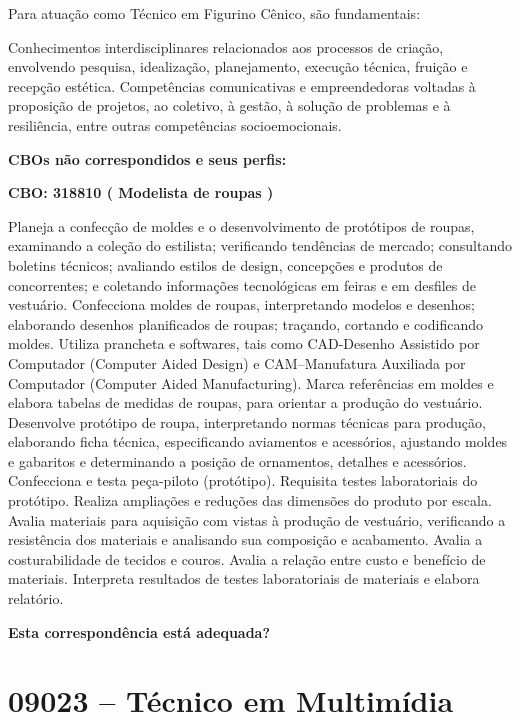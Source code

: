 \documentclass[
]{article}
\begin{document}
Para atuação como Técnico em Figurino Cênico, são fundamentais:

Conhecimentos interdisciplinares relacionados aos processos de criação,
envolvendo pesquisa, idealização, planejamento, execução técnica,
fruição e recepção estética. Competências comunicativas e empreendedoras
voltadas à proposição de projetos, ao coletivo, à gestão, à solução de
problemas e à resiliência, entre outras competências socioemocionais.

\textbf{CBOs não correspondidos e seus perfis:}

\textbf{CBO: 318810  ( Modelista de roupas )}

Planeja a confecção de moldes e o desenvolvimento de protótipos de
roupas, examinando a coleção do estilista; verificando tendências de
mercado; consultando boletins técnicos; avaliando estilos de design,
concepções e produtos de concorrentes; e coletando informações
tecnológicas em feiras e em desfiles de vestuário. Confecciona moldes de
roupas, interpretando modelos e desenhos; elaborando desenhos
planificados de roupas; traçando, cortando e codificando moldes. Utiliza
prancheta e softwares, tais como CAD-Desenho Assistido por Computador
(Computer Aided Design) e CAM--Manufatura Auxiliada por Computador
(Computer Aided Manufacturing). Marca referências em moldes e elabora
tabelas de medidas de roupas, para orientar a produção do vestuário.
Desenvolve protótipo de roupa, interpretando normas técnicas para
produção, elaborando ficha técnica, especificando aviamentos e
acessórios, ajustando moldes e gabaritos e determinando a posição de
ornamentos, detalhes e acessórios. Confecciona e testa peça-piloto
(protótipo). Requisita testes laboratoriais do protótipo. Realiza
ampliações e reduções das dimensões do produto por escala. Avalia
materiais para aquisição com vistas à produção de vestuário, verificando
a resistência dos materiais e analisando sua composição e acabamento.
Avalia a costurabilidade de tecidos e couros. Avalia a relação entre
custo e benefício de materiais. Interpreta resultados de testes
laboratoriais de materiais e elabora relatório.

\begin{Form}
\textbf{Esta correspondência está adequada?} \\ 
\end{Form}

\newpage
\section{ 09023 -- Técnico em Multimídia }
\end{document}

